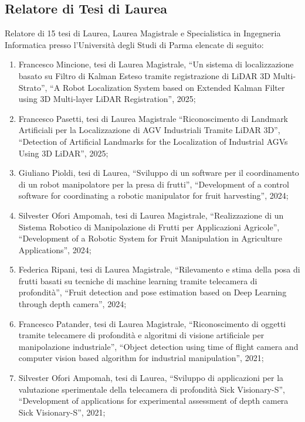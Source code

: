 \documentclass[11pt]{article}
\begin{document}
\begin{itemize}
\section*{Relatore di Tesi di Laurea}

Relatore di 15 tesi di Laurea, Laurea Magistrale e Specialistica in Ingegneria Informatica presso l'Universit\`a degli Studi di Parma elencate di seguito: 
\begin{enumerate}
\item Francesco Mincione, tesi di Laurea Magistrale, ``Un sistema di localizzazione basato su Filtro di Kalman Esteso
tramite registrazione di LiDAR 3D Multi-Strato'', 
  ``A Robot Localization System based on Extended Kalman Filter using 3D Multi-layer LiDAR Registration'', 2025; 
%
\item Francesco Pasetti, tesi di Laurea Magistrale ``Riconoscimento di Landmark Artificiali per la Localizzazione di AGV Industriali
Tramite LiDAR 3D'', 
  ``Detection of Artificial Landmarks for the Localization of Industrial AGVs Using 3D LiDAR'', 2025;
%
\item Giuliano Pioldi, tesi di Laurea, ``Sviluppo di un software per il coordinamento di un robot manipolatore per la presa di frutti'', 
  ``Development of a control software for coordinating a robotic manipulator for fruit harvesting'', 2024; 
%
\item Silvester Ofori Ampomah, tesi di Laurea Magistrale, ``Realizzazione di un Sistema Robotico di Manipolazione di Frutti per Applicazioni Agricole'', 
  ``Development of a Robotic System for Fruit Manipulation in Agriculture Applications'', 2024; 
%
\item Federica Ripani, tesi di Laurea Magistrale, ``Rilevamento e stima della posa di frutti basati su tecniche di machine learning tramite telecamera di profondit\`a'', 
  ``Fruit detection and pose estimation based on Deep Learning through depth camera'', 2024; 
%
\item Francesco Patander, tesi di Laurea Magistrale, ``Riconoscimento di oggetti tramite telecamere di profondità e algoritmi di visione artificiale per manipolazione industriale'', 
   ``Object detection using time of flight camera and computer vision based algorithm for industrial manipulation'', 2021;
\item Silvester Ofori Ampomah, tesi di Laurea, ``Sviluppo di applicazioni per la valutazione sperimentale della telecamera di profondità Sick Visionary-S'',
``Development of applications for experimental assessment of depth camera Sick Visionary-S'', 2021; 

\end{enumerate}
\end{itemize}
\end{document}
